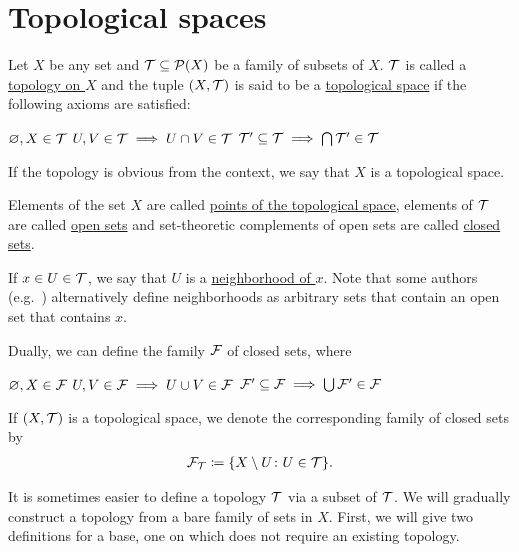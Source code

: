 \section{Topological spaces}\label{sec:topological_spaces}

\begin{definition}\label{def:topological_space}\cite[11]{Engelking1989}
  Let $X$ be any set and $\mathcal T \subseteq \operatorname{\mathcal P}(X)$ be a family of subsets of $X$. $\mathcal T$ is called a \uline{topology on $X$} and the tuple $(X, \mathcal T)$ is said to be a \uline{topological space} if the following axioms are satisfied:
  \begin{description}
     $\varnothing, X \in \mathcal T$
     $U, V \in \mathcal T \implies U \cap V \in \mathcal T$
     $\mathcal T' \subseteq \mathcal T \implies \bigcap \mathcal T' \in \mathcal T$
  \end{description}

  If the topology is obvious from the context, we say that $X$ is a topological space.

  Elements of the set $X$ are called \uline{points of the topological space}, elements of $\mathcal T$ are called \uline{open sets} and set-theoretic complements of open sets are called \uline{closed sets}.

  If $x \in U \in \mathcal T$, we say that $U$ is a \uline{neighborhood of $x$}. Note that some authors (e.g.~\cite[38]{Kelley1955}) alternatively define neighborhoods as arbitrary sets that contain an open set that contains $x$.

  Dually, we can define the family $\mathcal F$ of closed sets, where
  \begin{description}
     $\varnothing, X \in \mathcal F$
     $U, V \in \mathcal F \implies U \cup V \in \mathcal F$
     $\mathcal F' \subseteq \mathcal F \implies \bigcup \mathcal F' \in \mathcal F$
  \end{description}

  If $(X, \mathcal T)$ is a topological space, we denote the corresponding family of closed sets by
  \begin{align*}
    \mathcal F_{\mathcal T} \coloneqq \{ X \setminus U \colon U \in \mathcal T \}.
  \end{align*}
\end{definition}

It is sometimes easier to define a topology $\mathcal T$ via a subset of $\mathcal T$. We will gradually construct a topology from a bare family of sets in $X$. First, we will give two definitions for a base, one on which does not require an existing topology.

